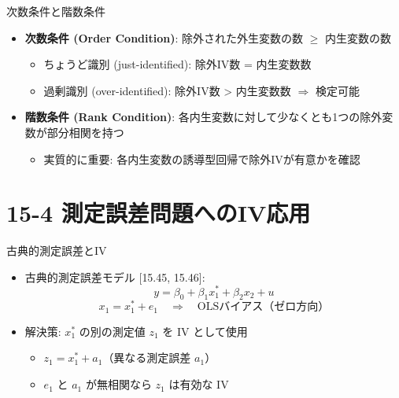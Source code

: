 \documentclass[
  ignorenonframetext,
]{beamer}
\providecommand{\tightlist}{%
  \setlength{\itemsep}{0pt}\setlength{\parskip}{0pt}}
\begin{document}
\begin{frame}{次数条件と階数条件}
\label{ux6b21ux6570ux6761ux4ef6ux3068ux968eux6570ux6761ux4ef6}
\begin{itemize}
\tightlist
\item
  \textbf{次数条件 (Order Condition)}: 除外された外生変数の数 \(\geq\)
  内生変数の数

  \begin{itemize}
  \tightlist
  \item
    ちょうど識別 (just-identified): 除外IV数 = 内生変数数
  \item
    過剰識別 (over-identified): 除外IV数 \textgreater{} 内生変数数
    \(\Rightarrow\) 検定可能
  \end{itemize}
\item
  \textbf{階数条件 (Rank Condition)}:
  各内生変数に対して少なくとも1つの除外変数が部分相関を持つ

  \begin{itemize}
  \tightlist
  \item
    実質的に重要: 各内生変数の誘導型回帰で除外IVが有意かを確認
  \end{itemize}
\end{itemize}
\end{frame}

\section{15-4
測定誤差問題へのIV応用}\label{ux6e2cux5b9aux8aa4ux5deeux554fux984cux3078ux306eivux5fdcux7528}

\begin{frame}{古典的測定誤差とIV}
\label{ux53e4ux5178ux7684ux6e2cux5b9aux8aa4ux5deeux3068iv}
\begin{itemize}
\tightlist
\item
  古典的測定誤差モデル {[}15.45, 15.46{]}:
  \[y = \beta_0 + \beta_1 x_1^* + \beta_2 x_2 + u\]
  \[x_1 = x_1^* + e_1 \quad \Rightarrow \quad \text{OLSバイアス（ゼロ方向）}\]
\item
  解決策: \(x_1^*\) の別の測定値 \(z_1\) を IV として使用

  \begin{itemize}
  \tightlist
  \item
    \(z_1 = x_1^* + a_1\)（異なる測定誤差 \(a_1\)）
  \item
    \(e_1\) と \(a_1\) が無相関なら \(z_1\) は有効な IV
  \end{itemize}
\end{itemize}
\end{frame}
\end{document}
